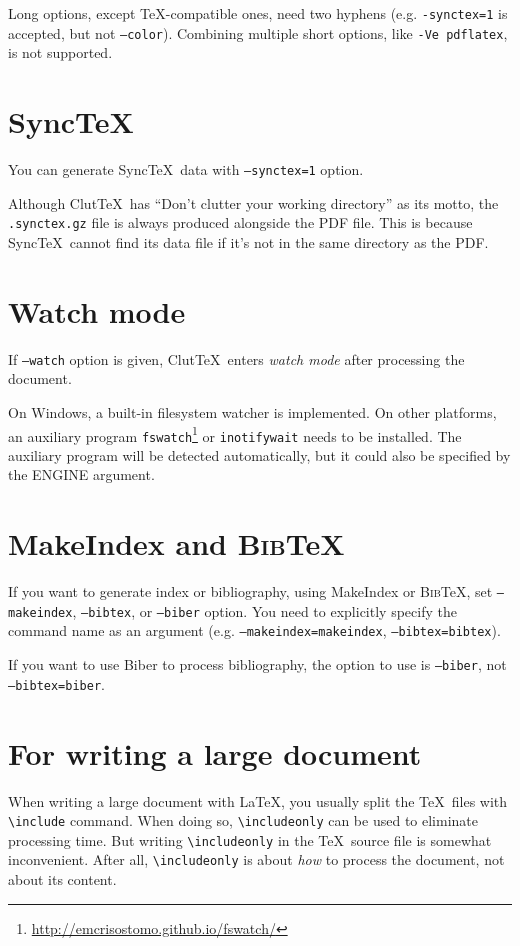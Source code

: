 \documentclass[a4paper]{report}
\newcommand\ClutTeX{Clut\TeX}
\providecommand\BibTeX{\textsc{Bib}\TeX}
\newcommand\texcmd[1]{\texttt{\textbackslash #1}}
\newcommand\metavar[1]{\textnormal{\textsf{#1}}}
\begin{document}
Long options, except \TeX-compatible ones, need two hyphens (e.g. \texttt{-synctex=1} is accepted, but not \texttt{--color}).
Combining multiple short options, like \texttt{-Ve pdflatex}, is not supported.

\section{Sync\TeX}\label{sec:synctex}
You can generate Sync\TeX\ data with \texttt{--synctex=1} option.

Although \ClutTeX\ has ``Don't clutter your working directory'' as its motto, the \texttt{.synctex.gz} file is always produced alongside the PDF file.
This is because Sync\TeX\ cannot find its data file if it's not in the same directory as the PDF.

\section{Watch mode}\label{sec:watch-mode}
If \texttt{--watch} option is given, \ClutTeX\ enters \emph{watch mode} after processing the document.

On Windows, a built-in filesystem watcher is implemented.
On other platforms, an auxiliary program \texttt{fswatch}\footnote{\url{http://emcrisostomo.github.io/fswatch/}} or \texttt{inotifywait} needs to be installed.
The auxiliary program will be detected automatically, but it could also be specified by the \metavar{ENGINE} argument.

\section{MakeIndex and \BibTeX}
If you want to generate index or bibliography, using MakeIndex or \BibTeX, set \texttt{--makeindex}, \texttt{--bibtex}, or \texttt{--biber} option.
You need to explicitly specify the command name as an argument (e.g. \texttt{--makeindex=makeindex}, \texttt{--bibtex=bibtex}).

If you want to use Biber to process bibliography, the option to use is \texttt{--biber}, not \texttt{--bibtex=biber}.

\section{For writing a large document}
When writing a large document with \LaTeX, you usually split the \TeX\ files with \texcmd{include} command.
When doing so, \texcmd{includeonly} can be used to eliminate processing time.
But writing \texcmd{includeonly} in the \TeX\ source file is somewhat inconvenient.
After all, \texcmd{includeonly} is about \emph{how} to process the document, not about its content.
\end{document}
